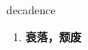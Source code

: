 
\begin{frame}
{\huge decadence}
\begin{center}
\begin{enumerate}\Large
  \item \textbf{衰落，颓废}
\end{enumerate}
\end{center}
\end{frame}
